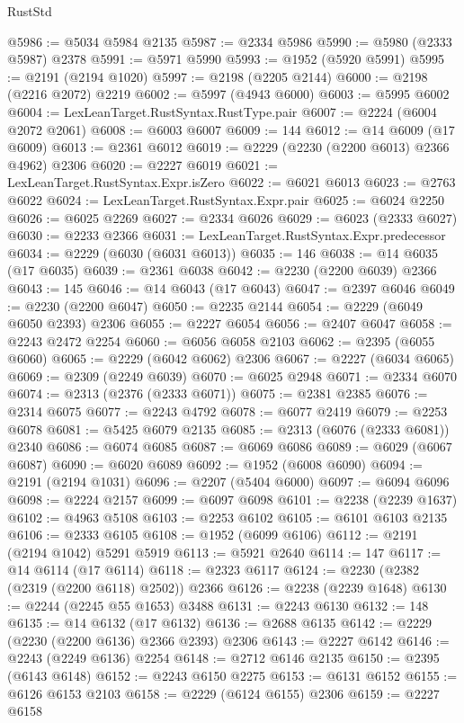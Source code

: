 \begin{lexlean}{RustStd}
\begin{coremodule}
@5986 := @5034 @5984 @2135
@5987 := @2334 @5986
@5990 := @5980 (@2333 @5987) @2378
@5991 := @5971 @5990
@5993 := @1952 (@5920 @5991)
@5995 := @2191 (@2194 @1020)
@5997 := @2198 (@2205 @2144)
@6000 := @2198 (@2216 @2072) @2219
@6002 := @5997 (@4943 @6000)
@6003 := @5995 @6002
@6004 := LexLeanTarget.RustSyntax.RustType.pair
@6007 := @2224 (@6004 @2072 @2061)
@6008 := @6003 @6007
@6009 := 144
@6012 := @14 @6009 (@17 @6009)
@6013 := @2361 @6012
@6019 := @2229 (@2230 (@2200 @6013) @2366 @4962) @2306
@6020 := @2227 @6019
@6021 := LexLeanTarget.RustSyntax.Expr.isZero
@6022 := @6021 @6013
@6023 := @2763 @6022
@6024 := LexLeanTarget.RustSyntax.Expr.pair
@6025 := @6024 @2250
@6026 := @6025 @2269
@6027 := @2334 @6026
@6029 := @6023 (@2333 @6027)
@6030 := @2233 @2366
@6031 := LexLeanTarget.RustSyntax.Expr.predecessor
@6034 := @2229 (@6030 (@6031 @6013))
@6035 := 146
@6038 := @14 @6035 (@17 @6035)
@6039 := @2361 @6038
@6042 := @2230 (@2200 @6039) @2366
@6043 := 145
@6046 := @14 @6043 (@17 @6043)
@6047 := @2397 @6046
@6049 := @2230 (@2200 @6047)
@6050 := @2235 @2144
@6054 := @2229 (@6049 @6050 @2393) @2306
@6055 := @2227 @6054
@6056 := @2407 @6047
@6058 := @2243 @2472 @2254
@6060 := @6056 @6058 @2103
@6062 := @2395 (@6055 @6060)
@6065 := @2229 (@6042 @6062) @2306
@6067 := @2227 (@6034 @6065)
@6069 := @2309 (@2249 @6039)
@6070 := @6025 @2948
@6071 := @2334 @6070
@6074 := @2313 (@2376 (@2333 @6071))
@6075 := @2381 @2385
@6076 := @2314 @6075
@6077 := @2243 @4792
@6078 := @6077 @2419
@6079 := @2253 @6078
@6081 := @5425 @6079 @2135
@6085 := @2313 (@6076 (@2333 @6081)) @2340
@6086 := @6074 @6085
@6087 := @6069 @6086
@6089 := @6029 (@6067 @6087)
@6090 := @6020 @6089
@6092 := @1952 (@6008 @6090)
@6094 := @2191 (@2194 @1031)
@6096 := @2207 (@5404 @6000)
@6097 := @6094 @6096
@6098 := @2224 @2157
@6099 := @6097 @6098
@6101 := @2238 (@2239 @1637)
@6102 := @4963 @5108
@6103 := @2253 @6102
@6105 := @6101 @6103 @2135
@6106 := @2333 @6105
@6108 := @1952 (@6099 @6106)
@6112 := @2191 (@2194 @1042) @5291 @5919
@6113 := @5921 @2640
@6114 := 147
@6117 := @14 @6114 (@17 @6114)
@6118 := @2323 @6117
@6124 := @2230 (@2382 (@2319 (@2200 @6118) @2502)) @2366
@6126 := @2238 (@2239 @1648)
@6130 := @2244 (@2245 @55 @1653) @3488
@6131 := @2243 @6130
@6132 := 148
@6135 := @14 @6132 (@17 @6132)
@6136 := @2688 @6135
@6142 := @2229 (@2230 (@2200 @6136) @2366 @2393) @2306
@6143 := @2227 @6142
@6146 := @2243 (@2249 @6136) @2254
@6148 := @2712 @6146 @2135
@6150 := @2395 (@6143 @6148)
@6152 := @2243 @6150 @2275
@6153 := @6131 @6152
@6155 := @6126 @6153 @2103
@6158 := @2229 (@6124 @6155) @2306
@6159 := @2227 @6158

\end{coremodule}
\end{lexlean}
